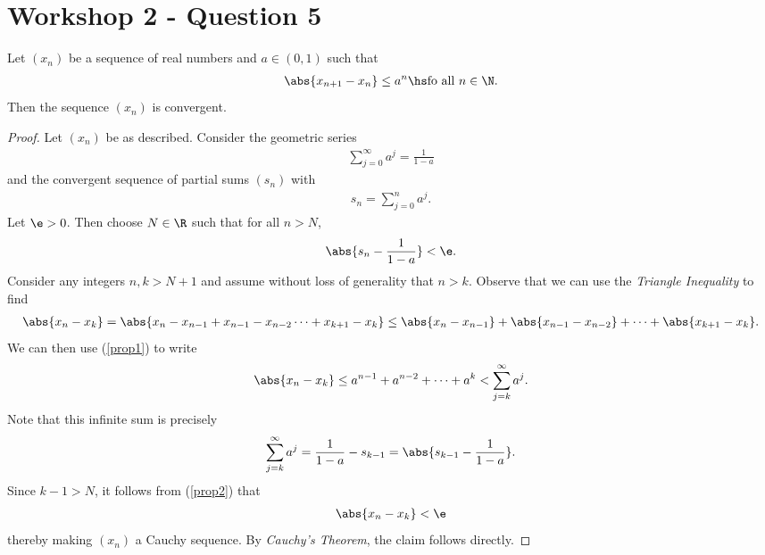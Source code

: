 \documentclass{article}
\begin{document}
\section{Workshop 2 - Question 5}

\begin{claim}
   Let $(x_n)$ be a sequence of real numbers and $a\in(0,1)$ such that
   \begin{align}
      \label{prop1}
      \abs{x_{n+1}-x_n} \leq a^n\hs\text{fo all }n\in\N.
   \end{align}
   Then the sequence $(x_n)$ is convergent.
\end{claim}
\begin{proof}
   Let $(x_n)$ be as described. Consider the geometric series
   \begin{align*}
      \sum_{j=0}^\infty a^j = \frac{1}{1-a}
   \end{align*}
   and the convergent sequence of partial sums $(s_n)$ with
   \begin{align*}
      s_n = \sum_{j=0}^n a^j.
   \end{align*}
   Let $\e>0$. Then choose $N\in\R$ such that for all $n>N$,
   \begin{align}
      \label{prop2}
      \abs{s_n-\frac{1}{1-a}} < \e.
   \end{align}
   Consider any integers $n,k>N+1$ and assume without loss of generality that $n>k$.
   Observe that we can use the \emph{Triangle Inequality} to find
   \begin{align*}
      \abs{x_n - x_k} = \abs{x_n - x_{n-1} + x_{n-1} - x_{n-2} \cdots + x_{k+1} - x_k}
      \leq \abs{x_n-x_{n-1}} + \abs{x_{n-1} - x_{n-2}} + \cdots + \abs{x_{k+1} - x_k}.
   \end{align*}
   We can then use (\ref{prop1}) to write
   \begin{align*}
      \abs{x_n - x_k} \leq a^{n-1} + a^{n-2} + \cdots + a^k < \sum_{j=k}^\infty a^j.
   \end{align*}
   Note that this infinite sum is precisely
   \begin{align*}
      \sum_{j=k}^\infty a^j = \frac{1}{1-a}-s_{k-1}=\abs{s_{k-1}-\frac{1}{1-a}}.
   \end{align*}
   Since $k-1>N$, it follows from (\ref{prop2}) that
   \begin{align*}
      \abs{x_n - x_k} < \e
   \end{align*}
   thereby making $(x_n)$ a Cauchy sequence. By \emph{Cauchy's Theorem}, the claim follows directly.
\end{proof}
\end{document}

